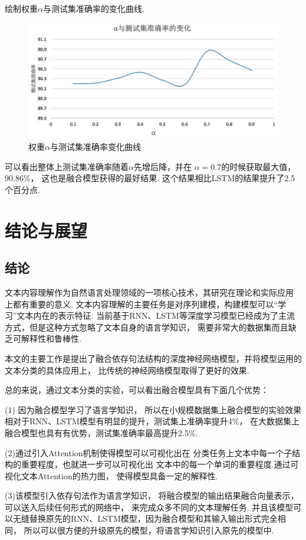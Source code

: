 \documentclass[bachelor,adobefonts]{jnuthesis}
\begin{document}
绘制权重$\alpha$与测试集准确率的变化曲线.

\begin{figure}[h!]
  \centering
  \includegraphics[width=0.6\linewidth]{权重变化.png}
  \caption{权重$\alpha$与测试集准确率变化曲线}
\end{figure}

可以看出整体上测试集准确率随着$\alpha$先增后降，并在
$\alpha = 0.7$的时候获取最大值，90.86\%，
这也是融合模型获得的最好结果.
这个结果相比LSTM的结果提升了2.5个百分点.

\chapter{结论与展望}
\section{结论}
文本内容理解作为自然语言处理领域的一项核心技术，其研究在理论和实际应用
上都有重要的意义.
文本内容理解的主要任务是对序列建模，构建模型可以“学习”文本内在的表示特征.
当前基于RNN、LSTM等深度学习模型已经成为了主流方式，但是这种方式忽略了文本自身的语言学知识，
需要非常大的数据集而且缺乏可解释性和鲁棒性.

本文的主要工作是提出了融合依存句法结构的深度神经网络模型，并将模型运用的文本分类的具体应用上，
比传统的神经网络模型取得了更好的效果.

总的来说，通过文本分类的实验，可以看出融合模型具有下面几个优势：

(1) 因为融合模型学习了语言学知识，
所以在小规模数据集上融合模型的实验效果相对于RNN、LSTM模型有明显的提升，测试集上准确率提升4\%，
在大数据集上融合模型也具有有优势，测试集准确率最高提升2.5\%.

(2)通过引入Attention机制使得模型可以可视化出在
分类任务上文本中每一个子结构的重要程度，也就进一步可以可视化出
文本中的每一个单词的重要程度.通过可视化文本Attention的热力图，
使得模型具备一定的解释性.

(3)该模型引入依存句法作为语言学知识，
将融合模型的输出结果融合向量表示，可以送入后续任何形式的网络中，
来完成众多不同的文本理解任务.
并且该模型可以无缝替换原先的RNN、LSTM模型，因为融合模型和其输入输出形式完全相同，
所以可以很方便的升级原先的模型，将语言学知识引入原先的模型中.
\end{document}
